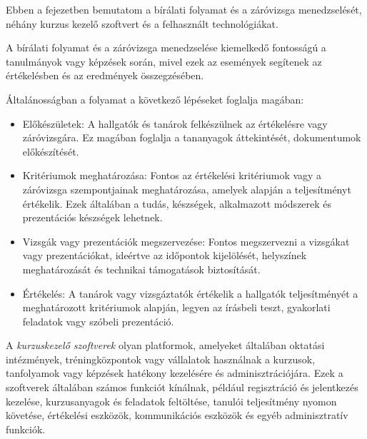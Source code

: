 
Ebben a fejezetben bemutatom a bírálati folyamat és a záróvizsga menedzselését, néhány kurzus kezelő szoftvert és a felhasznált technológiákat.


A bírálati folyamat és a záróvizsga menedzselése kiemelkedő fontosságú a tanulmányok vagy képzések során, mivel ezek az események segítenek az értékelésben és az eredmények összegzésében.

Általánosságban a folyamat a következő lépéseket foglalja magában:

\begin{itemize}

\item Előkészületek: A hallgatók és tanárok felkészülnek az értékelésre vagy záróvizsgára. Ez magában foglalja a tananyagok áttekintését, dokumentumok előkészítését.

\item Kritériumok meghatározása: Fontos az értékelési kritériumok vagy a záróvizsga szempontjainak meghatározása, amelyek alapján a teljesítményt értékelik. Ezek általában a tudás, készségek, alkalmazott módszerek és prezentációs készségek lehetnek.

\item Vizsgák vagy prezentációk megszervezése: Fontos megszervezni a vizsgákat vagy prezentációkat, ideértve az időpontok kijelölését, helyszínek meghatározását és technikai támogatások biztosítását.

\item Értékelés: A tanárok vagy vizsgáztatók értékelik a hallgatók teljesítményét a meghatározott kritériumok alapján, legyen az írásbeli teszt, gyakorlati feladatok vagy szóbeli prezentáció.

\end{itemize}



A \textit{kurzuskezelő szoftverek} \cite{course} olyan platformok, amelyeket általában oktatási intézmények, tréningközpontok vagy vállalatok használnak a kurzusok, tanfolyamok vagy képzések hatékony kezelésére és adminisztrációjára. Ezek a szoftverek általában számos funkciót kínálnak, például regisztráció és jelentkezés kezelése, kurzusanyagok és feladatok feltöltése, tanulói teljesítmény nyomon követése, értékelési eszközök, kommunikációs eszközök és egyéb adminisztratív funkciók.

